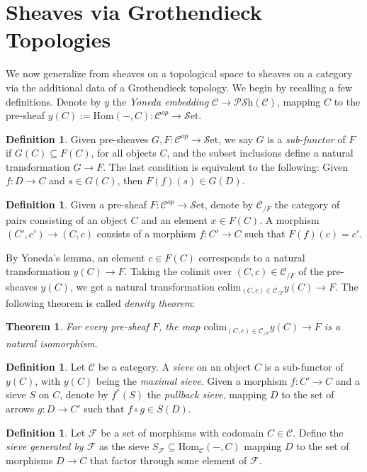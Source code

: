 \documentclass[10pt]{amsart}
\newcommand{\C}{\mathscr{C}}
\newcommand{\F}{\mathscr{F}}
\newcommand{\Hom}{\mathrm{Hom}}
\newcommand{\set}{\mathscr{S}\mathrm{et}}
\newcommand{\colim}{\mathrm{colim}}
\newcommand{\PSh}{\mathscr{P}\mathscr{S}\mathrm{h}}
\newtheorem{theorem}[equation]{Theorem}
\theoremstyle{definition}
\newtheorem{definition}[equation]{Definition}
\theoremstyle{remark}
\numberwithin{equation}{section}
\begin{document}
	\section{Sheaves via Grothendieck Topologies}
	
	We now generalize from sheaves on a topological space to sheaves on a category via the additional data of a Grothendieck topology. We begin by recalling a few definitions. Denote by $y$ the \textit{Yoneda embedding} $\C\to\PSh(\C)$, mapping $C$ to the pre-sheaf $y(C):=\Hom(-,C)\colon\C^{op}\to\set$. 
	\begin{definition}
		Given pre-sheaves $G,F\colon\C^{op}\to\set$, we say $G$ is a \emph{sub-functor} of $F$ if $G(C)\subseteq F(C)$, for all objects $C$, and the subset inclusions define a natural transformation $G\to F$. The last condition is equivalent to the following: Given $f\colon D\to C$ and $s\in G(C)$, then $F(f)(s)\in G(D)$. 
	\end{definition}
	\begin{definition}
		Given a pre-sheaf $F\colon\C^{op}\to\set$, denote by $\C_{/F}$ the category of pairs  consisting of an object $C$ and an element $x\in F(C)$. A morphism $(C',c')\to(C,c)$ consists of a morphism $f\colon C'\to C$ such that $F(f)(c)=c'$. 
	\end{definition}By Yoneda's lemma, an element $c\in F(C)$ corresponds to a natural transformation $y(C)\rightarrow F$. Taking the colimit over $(C,c)\in\C_{/F}$ of the pre-sheaves $y(C)$, we get a natural transformation $\colim_{(C,c)\in\C_{/F}}y(C)\rightarrow F$. The following theorem is called \textit{density theorem}:
	\begin{theorem}\label{density}
		For every pre-sheaf $F$, the map $\colim_{(C,c)\in\C_{/F}}y(C)\rightarrow F$ is a natural isomorphism.
	\end{theorem}
	\begin{definition}
		Let $\C$ be a category. A \emph{sieve} on an object $C$ is a sub-functor of $y(C)$, with $y(C)$ being the \textit{maximal sieve}. Given a morphism $f\colon C'\to C$ and a sieve $S$ on $C$, denote by $f^*(S)$ the \textit{pullback sieve}, mapping $D$ to the set of arrows $g\colon D\to C'$ such that $f\circ g\in S(D)$. 
	\end{definition}
	\begin{definition}\label{def:generatedsieve}
		Let ${\F}$ be a set of morphisms with codomain $C\in\C$. Define the \emph{sieve generated by $\F$} as the sieve $S_\F\subseteq\Hom_\C(-,C)$ mapping $D$ to the set of morphisms $D\to C$ that factor through some element of $\F$. 
	\end{definition}
\end{document}
